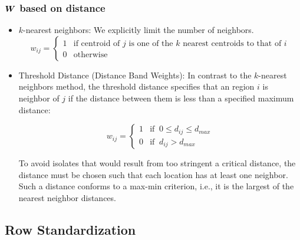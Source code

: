 \documentclass[english,10pt]{beamer}\usepackage[]{graphicx}\usepackage[]{xcolor}
\begin{document}
\begin{frame}
  \frametitle{$\bm W$ based on distance}
    \begin{itemize}
      \item $k$-nearest neighbors: We explicitly limit the number of neighbors. 
      \begin{equation}
  w_{ij} =
  \begin{cases}
  1 & \mbox{if centroid of $j$ is one of the $k$ nearest centroids to that of $i$}  \\
  0 & \mbox{otherwise}
  \end{cases}
\end{equation}

\item Threshold Distance (Distance Band Weights): In contrast to the $k$-nearest neighbors method, the threshold distance specifies that an region $i$ is neighbor of $j$ if the distance between them is less than a specified maximum distance:


\begin{equation}
  w_{ij}= 
   \begin{cases}
      1 & \mbox{if}\;\; 0\leq d_{ij} \leq d_{max} \\ 
      0 & \mbox{if}\;\; d_{ij} > d_{max}
   \end{cases}
\end{equation}


To avoid isolates that would result from too stringent a critical distance, the distance must be chosen such that each location has at least one neighbor. Such a distance conforms to a max-min criterion, i.e., it is the largest of the nearest neighbor distances.
\end{itemize}
\end{frame}

\subsection{Row Standardization}
\end{document}
